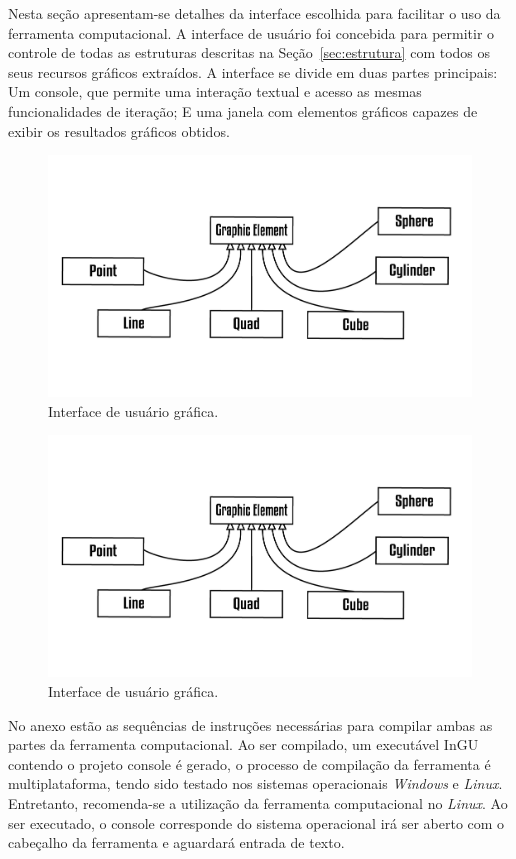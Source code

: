 \documentclass[a4paper,12pt]{monografia}
\theoremstyle{plain}
\theoremstyle{definition}
\theoremstyle{remark}
\begin{document}
Nesta seção apresentam-se detalhes da interface escolhida para facilitar o uso da ferramenta computacional. A interface de usuário foi concebida para permitir o controle de todas as estruturas descritas na Seção~\ref{sec:estrutura} com todos os seus recursos gráficos extraídos. A interface se divide em duas partes principais: Um console, que permite uma interação textual e acesso as mesmas funcionalidades de iteração; E uma janela com elementos gráficos capazes de exibir os resultados gráficos obtidos. 

\begin{figure}[!htbp]
	\centering
	\includegraphics[scale=1]{Figures/GraphicElements}
	\caption{Interface de usuário gráfica.}
	\label{fig10:UI}
\end{figure}

\begin{figure}[!htbp]
	\centering
	\includegraphics[scale=1]{Figures/GraphicElements}
	\caption{Interface de usuário gráfica.}
	\label{fig10:UI}
\end{figure}

No anexo estão as sequências de instruções necessárias para compilar ambas as partes da ferramenta computacional. Ao ser compilado, um executável InGU contendo o projeto console é gerado, o processo de compilação da ferramenta é multiplataforma, tendo sido testado nos sistemas operacionais \textit{Windows} e \textit{Linux}. Entretanto, recomenda-se a utilização da ferramenta computacional no \textit{Linux}. Ao ser executado, o console corresponde do sistema operacional irá ser aberto com o cabeçalho da ferramenta e aguardará entrada de texto.
\end{document}
